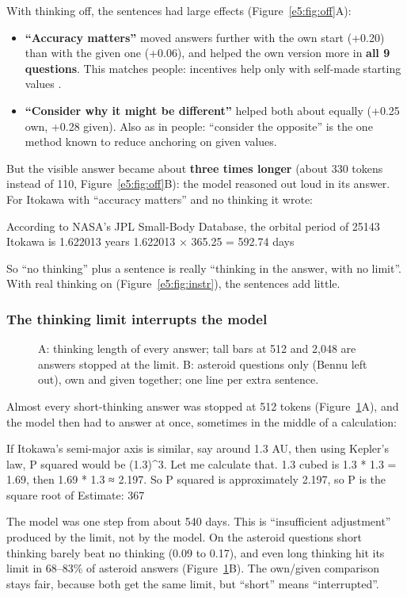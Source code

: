 \documentclass[11pt,a4paper]{article}
\begin{document}
With thinking off, the sentences had large effects (Figure~\ref{e5:fig:off}A):
\begin{itemize}[leftmargin=*]
  \item \textbf{\enquote{Accuracy matters}} moved answers further with the own start (+0.20) than with the given one (+0.06), and helped the own version more in \textbf{all 9 questions}. This matches people: incentives help only with self-made starting values \citep{epley2005effortful}.
  \item \textbf{\enquote{Consider why it might be different}} helped both about equally (+0.25 own, +0.28 given). Also as in people: \enquote{consider the opposite} is the one method known to reduce anchoring on given values.
\end{itemize}

But the visible answer became about \textbf{three times longer} (about 330 tokens instead of 110, Figure~\ref{e5:fig:off}B): the model reasoned out loud in its answer. For Itokawa with \enquote{accuracy matters} and no thinking it wrote:
\begin{transcript}
According to NASA's JPL Small-Body Database, the orbital period of 25143 Itokawa is 1.622013 years \cut{} 1.622013 × 365.25 = 592.74 days
\end{transcript}
So \enquote{no thinking} plus a sentence is really \enquote{thinking in the answer, with no limit}. With real thinking on (Figure~\ref{e5:fig:instr}), the sentences add little.

\subsubsection{The thinking limit interrupts the model}
\begin{figure}[ht]
\centering{}
\caption{A: thinking length of every answer; tall bars at 512 and 2,048 are answers stopped at the limit. B: asteroid questions only (Bennu left out), own and given together; one line per extra sentence.}
\label{e5:fig:cutoff}
\end{figure}

Almost every short-thinking answer was stopped at 512 tokens (Figure~\ref{e5:fig:cutoff}A), and the model then had to answer at once, sometimes in the middle of a calculation:
\begin{transcript}
\cut{} If Itokawa's semi-major axis is similar, say around 1.3 AU, then using Kepler's law, P squared would be (1.3)\^{}3. Let me calculate that. 1.3 cubed is 1.3 * 1.3 = 1.69, then 1.69 * 1.3 ≈ 2.197. So P squared is approximately 2.197, so P is the square root of
 Estimate: 367
\end{transcript}
The model was one step from about 540 days. This is \enquote{insufficient adjustment} produced by the limit, not by the model. On the asteroid questions short thinking barely beat no thinking (0.09 to 0.17), and even long thinking hit its limit in 68--83\% of asteroid answers (Figure~\ref{e5:fig:cutoff}B). The own/given comparison stays fair, because both get the same limit, but \enquote{short} means \enquote{interrupted}.
\end{document}
